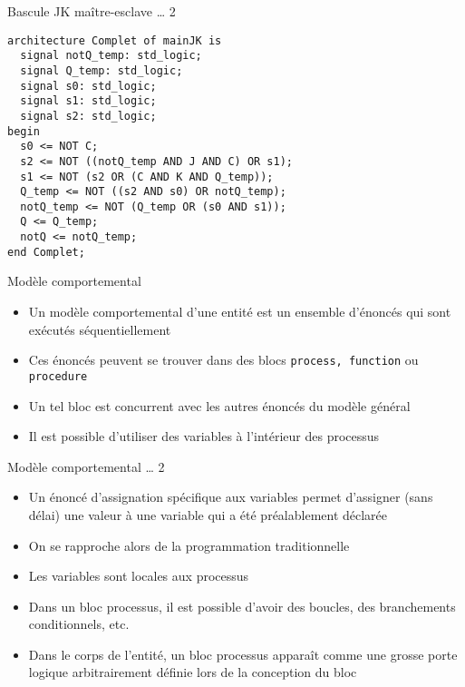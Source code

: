 \documentclass[presentation]{beamer}
\begin{document}
\begin{frame}[label={sec:orgd03bb0f},fragile]{Bascule JK maître-esclave \ldots{} 2}
 \begin{verbatim}
architecture Complet of mainJK is
  signal notQ_temp: std_logic;
  signal Q_temp: std_logic;
  signal s0: std_logic;
  signal s1: std_logic;
  signal s2: std_logic;
begin
  s0 <= NOT C;
  s2 <= NOT ((notQ_temp AND J AND C) OR s1);
  s1 <= NOT (s2 OR (C AND K AND Q_temp));
  Q_temp <= NOT ((s2 AND s0) OR notQ_temp);
  notQ_temp <= NOT (Q_temp OR (s0 AND s1));
  Q <= Q_temp;
  notQ <= notQ_temp;
end Complet;
\end{verbatim}
\end{frame}

\begin{frame}[label={sec:org25f088b},fragile]{Modèle comportemental}
 \begin{itemize}
\item Un modèle comportemental d'une entité est un ensemble d'énoncés qui sont exécutés séquentiellement
\item Ces énoncés peuvent se trouver dans des blocs \texttt{process, function} ou \texttt{procedure}
\item Un tel bloc est concurrent avec les autres énoncés du modèle général
\item Il est possible d'utiliser des variables à l'intérieur des processus
\end{itemize}
\end{frame}

\begin{frame}[label={sec:orgf86b72a}]{Modèle comportemental \ldots{} 2}
\begin{itemize}
\item Un énoncé d'assignation spécifique aux variables permet d'assigner (sans délai) une valeur à une variable qui a été préalablement déclarée
\item On se rapproche alors de la programmation traditionnelle
\item Les variables sont locales aux processus
\item Dans un bloc processus, il est possible d'avoir des boucles, des branchements conditionnels, etc.
\item Dans le corps de l'entité, un bloc processus apparaît comme une grosse porte logique arbitrairement définie lors de la conception du bloc
\end{itemize}
\end{frame}
\end{document}
